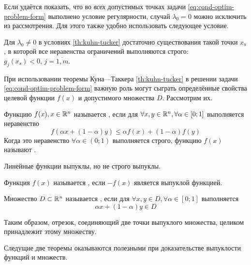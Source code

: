Если удаётся показать, что во \emph{всех} допустимых точках задачи
\eqref{eq:cond-optim-problem-form} выполнено условие регулярности,
случай $\lambda_0=0$ можно исключить из рассмотрения. Для этого также
удобно использовать следующее условие.

\begin{thm}
  \label{th:slater}
  Для $\lambda_0 \neq 0$ в условиях \ref{th:kuhn-tucker} достаточно
  существования такой точки $x_s$, в которой все неравенства
  ограничений выполняются строго: $g_j(x_s)<0, \, j=\overline{1,m}$.
\end{thm}

При использовании теоремы Куна—Таккера \ref{th:kuhn-tucker} в решении
задачи \eqref{eq:cond-optim-problem-form} важную роль могут сыграть
определённые свойства целевой функции $f(x)$ и допустимого множества
$D$. Рассмотрим их.

\begin{dfn}
  \label{dfn:convex-f}
  Функцию $f(x), x \in \mathbb{R}^n$ называется , если
  для $\forall x, y \in \mathbb{R}^n, \forall \alpha \in [0;1]$
  выполняется неравенство
  \begin{equation*}
    f(\alpha x + (1-\alpha)y) \leq \alpha f(x) + (1-\alpha) f(y)
  \end{equation*}
  Когда это неравенство $\forall \alpha \in (0;1)$ выполняется строго,
  функцию $f(x)$ называют .
\end{dfn}
\begin{rem}
  \label{rem:lin-f-convex}
  Линейные функции выпуклы, но не строго выпуклы.
\end{rem}

\begin{dfn}
  Функция $f(x)$ называется , если $-f(x)$ является
  выпуклой функцией.
\end{dfn}

\begin{dfn}
  Множество $D \subset \mathbb{R}^n$ называется , если
  для $\forall x, y \in D, \forall \alpha \in [0;1]$ выполняется
  \begin{equation*}
    \alpha x + (1-\alpha) y \in D
  \end{equation*}
\end{dfn}
Таким образом, отрезок, соединяющий две точки выпуклого множества,
целиком принадлежит этому множеству.

Следущие две теоремы оказываются полезными при доказательстве
выпуклости функций и множеств.

